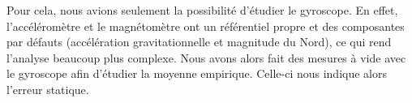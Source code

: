 Pour cela, nous avions seulement la possibilité d'étudier le gyroscope. En effet, l'accéléromètre et le magnétomètre ont un référentiel propre et des composantes par défauts (accélération gravitationnelle et magnitude du Nord), ce qui rend l'analyse beaucoup plus complexe. Nous avons alors fait des mesures à vide avec le gyroscope afin d'étudier la moyenne empirique. Celle-ci nous indique alors l'erreur statique.
